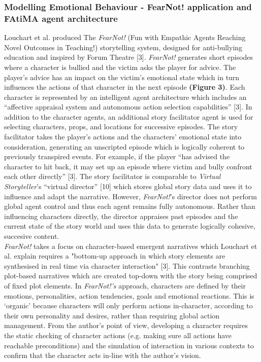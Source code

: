 \documentclass{sig-alternate-05-2015}
\begin{document}
\subsubsection{Modelling Emotional Behaviour - FearNot! application and FAtiMA agent architecture}
Louchart et al. produced The \textit{FearNot!} (Fun with Empathic Agents Reaching Novel Outcomes in Teaching!) storytelling system, designed for anti-bullying education and inspired by Forum Theatre [3]. \textit{FearNot!} generates short episodes where a character is bullied and the victim asks the player for advice. The player's advice has an impact on the victim's emotional state which in turn influences the actions of that character in the next episode \textbf{(Figure 3)}. Each character is represented by an intelligent agent architecture which includes an ``affective appraisal system and autonomous action selection capabilities'' [3]. In addition to the character agents, an additional story facilitator agent is used for selecting characters, props, and locations for successive episodes. The story facilitator takes the player's actions and the characters' emotional state into consideration, generating an unscripted episode which is logically coherent to previously transpired events. For example, if the player ``has advised the character to hit back, it may set up an episode where victim and bully confront each other directly'' [3]. The story facilitator is comparable to \textit{Virtual Storyteller}'s ``virtual director'' [10] which stores global story data and uses it to influence and adapt the narrative. However, \textit{FearNot!}'s director does not perform global agent control and thus each agent remains fully autonomous. Rather than influencing characters directly, the director appraises past episodes and the current state of the story world and uses this data to generate logically cohesive, succesive content.\\

\textit{FearNot!} takes a focus on character-based emergent narratives which Louchart et al. explain requires a "bottom-up approach in which story elements are synthesised in real time via character interaction" [3]. This contrasts branching plot-based narratives which are created top-down with the story being comprised of fixed plot elements. In \textit{FearNot!'s} approach, characters are defined by their emotions, personalities, action tendencies, goals and emotional reactions. This is `organic' because characters will only perform actions in-character, according to their own personality and desires, rather than requiring global action management. From the author's point of view, developing a character requires the static checking of character actions (e.g. making sure all actions have reachable preconditions) and the simulation of interaction in various contexts to confirm that the character acts in-line with the author's vision.\\
\end{document}
